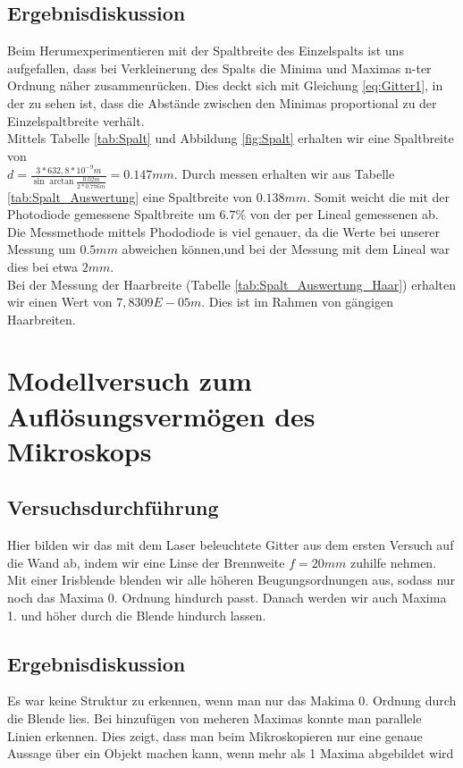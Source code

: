 \documentclass{scrartcl}
\begin{document}
\subsection{Ergebnisdiskussion}
Beim Herumexperimentieren mit der Spaltbreite des Einzelspalts ist uns aufgefallen, dass bei Verkleinerung des Spalts die Minima und Maximas n-ter Ordnung näher zusammenrücken. Dies deckt sich mit Gleichung \ref{eq:Gitter1}, in der zu sehen ist, dass die Abstände zwischen den Minimas proportional zu der Einzelspaltbreite verhält.\\
Mittels Tabelle \ref{tab:Spalt} und Abbildung \ref{fig:Spalt} erhalten wir eine Spaltbreite von \\$d = \frac{3 * 632,8 * 10^{-9}m}{\sin{\arctan{\frac{0.02m}{2* 0.776m}}}} = 0.147mm$. Durch messen erhalten wir aus Tabelle \ref{tab:Spalt_Auswertung} eine Spaltbreite von $0.138mm$. Somit weicht die mit der Photodiode gemessene Spaltbreite um $6.7\%$ von der per Lineal gemessenen ab. Die Messmethode mittels Phododiode is viel genauer, da die Werte bei unserer Messung um  $0.5 mm$ abweichen können,und bei der Messung mit dem Lineal war dies bei etwa $2mm$.\\
Bei der Messung der Haarbreite (Tabelle \ref{tab:Spalt_Auswertung_Haar}) erhalten wir einen Wert von $7,8309E-05 m$. Dies ist im Rahmen von gängigen Haarbreiten.
\section{Modellversuch zum Auflösungsvermögen des Mikroskops}
\subsection{Versuchsdurchführung}
Hier bilden wir das mit dem Laser beleuchtete Gitter aus dem ersten Versuch auf die Wand ab, indem wir eine Linse der Brennweite $f=20mm$ zuhilfe nehmen. Mit einer Irisblende blenden wir alle höheren Beugungsordnungen aus, sodass nur noch das Maxima 0. Ordnung hindurch passt. Danach werden wir auch Maxima 1. und höher durch die Blende hindurch lassen.
\subsection{Ergebnisdiskussion}
Es war keine Struktur zu erkennen, wenn man nur das Makima 0. Ordnung durch die Blende lies. Bei hinzufügen von meheren Maximas konnte man parallele Linien erkennen. Dies zeigt, dass man beim Mikroskopieren nur eine genaue Aussage über ein Objekt machen kann, wenn mehr als 1 Maxima abgebildet wird 
\end{document}
